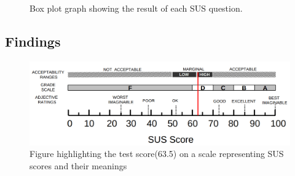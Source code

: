 \begin{figure}[H]
	\caption{Box plot graph showing the result of each SUS question.}
	\label{fig:boxPlotResults}
\end{figure}

\subsection{Findings}

\begin{figure}[H]
	\centering
	\includegraphics[width=1\linewidth]{figure/Design/susScore}
	\caption{Figure highlighting the test score(63.5) on a scale representing SUS scores and their meanings\cite{susScore}}
	\label{fig:susScore}
\end{figure}

